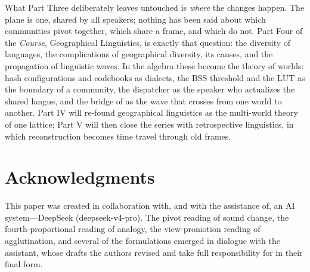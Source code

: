\documentclass[11pt,a4paper]{article}
\theoremstyle{remark}
\begin{document}
What Part Three deliberately leaves untouched is \emph{where} the changes
happen. The plane is one, shared by all speakers; nothing has been said about
which communities pivot together, which share a frame, and which do not. Part
Four of the \textit{Course}, Geographical Linguistics, is exactly that
question: the diversity of languages, the complications of geographical
diversity, its causes, and the propagation of linguistic waves. In the
algebra these become the theory of worlds: hash configurations and codebooks
as dialects, the BSS threshold and the LUT as the boundary of a community,
the dispatcher as the speaker who actualizes the shared langue, and the
bridge of \cite{companion2026} as the wave that crosses from one world to
another. Part IV will re-found geographical linguistics as the multi-world
theory of one lattice; Part V will then close the series with retrospective
linguistics, in which reconstruction becomes time travel through old frames.

\section*{Acknowledgments}
This paper was created in collaboration with, and with the assistance of, an
AI system---DeepSeek (deepseek-v4-pro). The pivot reading of sound change,
the fourth-proportional reading of analogy, the view-promotion reading of
agglutination, and several of the formulations emerged in dialogue with the
assistant, whose drafts the authors revised and take full responsibility for
in their final form.
\end{document}
